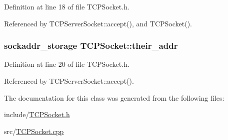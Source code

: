 Definition at line 18 of file T\+C\+P\+Socket.\+h.



Referenced by T\+C\+P\+Server\+Socket\+::accept(), and T\+C\+P\+Socket().

\hypertarget{classTCPSocket_a54b0073827ac57bbb4ee6c371791db0f}{
\subsubsection[{their\+\_\+addr}]{\setlength{\rightskip}{0pt plus 5cm}sockaddr\+\_\+storage T\+C\+P\+Socket\+::their\+\_\+addr\hspace{0.3cm}{\ttfamily [protected]}}}\label{classTCPSocket_a54b0073827ac57bbb4ee6c371791db0f}


Definition at line 20 of file T\+C\+P\+Socket.\+h.



Referenced by T\+C\+P\+Server\+Socket\+::accept().



The documentation for this class was generated from the following files\+:\begin{DoxyCompactItemize}
\item 
include/\hyperlink{TCPSocket_8h}{T\+C\+P\+Socket.\+h}\item 
src/\hyperlink{TCPSocket_8cpp}{T\+C\+P\+Socket.\+cpp}\end{DoxyCompactItemize}
